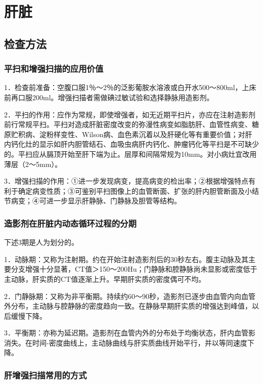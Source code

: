 \chapter{肝脏}

\section{检查方法}

\subsection{平扫和增强扫描的应用价值}

1．检查前准备：空腹口服1％～2％的泛影葡胺水溶液或白开水500～800ml，上床前再口服200ml。增强扫描者需做碘过敏试验和选择静脉用造影剂。

2．平扫的作用：应作为常规，即使增强者，如无近期平扫片，亦应在注射造影剂前行常规平扫。平扫对造成肝脏密度改变的弥漫性病变如脂肪肝、血管性病变、糖原贮积病、淀粉样变性、Wilson病、血色素沉着以及肝硬化等有重要价值；对肝内钙化灶的显示如肝内胆管结石、血吸虫病肝内钙化、肿瘤钙化等平扫是不可缺少的。平扫应从膈顶开始至肝下端为止。层厚和间隔常规为10mm。对小病灶宜改用薄层（2～5mm）。

3．增强扫描的作用：①进一步发现病变，提高病变的检出率；②根据增强特点有利于确定病变性质；③可鉴别平扫图像上的血管断面、扩张的肝内胆管断面及小结节病变；④可进一步显示肝静脉、门静脉及胆管等结构。

\subsection{造影剂在肝脏内动态循环过程的分期}

下述3期是人为划分的。

1．动脉期：又称为注射期。约在开始注射造影剂后的30秒左右。腹主动脉及其主要分支增强十分显著，CT值＞150～200Hu；门静脉和腔静脉尚未显影或密度低于主动脉，肝实质的CT值逐渐上升。早期肝实质的密度偶可不均。

2．门静脉期：又称为非平衡期。持续约60～90秒，造影剂已逐步由血管内向血管外分布，主动脉与腔静脉的密度趋向一致。在静脉早期肝实质的增强达到峰值，以后缓慢下降。

3．平衡期：亦称为延迟期。造影剂在血管内外的分布处于均衡状态，肝内血管影消失。在时间-密度曲线上，主动脉曲线与肝实质曲线开始平行，并以等同速度下降。

\subsection{肝增强扫描常用的方式}

